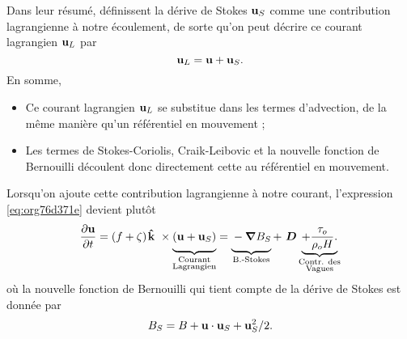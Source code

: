 \documentclass[10pt]{article}
\numberwithin{equation}{section}
\newcommand{\kvf}{\vb{\hat{k}}}
\newcommand{\uu}{\vb{u}}
\newcommand{\grande}{\vphantom{\frac{1}{xx}}}
\newcommand{\pt}{\hspace{1pt}} %
\begin{document}
Dans leur résumé, \Textcite{suzuki2016understanding}  définissent la dérive de Stokes \(\uu_S\) comme une contribution lagrangienne à notre écoulement, de sorte qu'on peut décrire ce courant lagrangien \(\uu_L\) par
\begin{equation}
   \uu_L = \uu + \uu_S.
\end{equation}
En somme, 
\begin{itemize}
\item Ce courant lagrangien \(\uu_L\) se substitue dans les termes d'advection, de la même manière qu'un référentiel en mouvement ;
\item Les termes de Stokes-Coriolis, Craik-Leibovic et la nouvelle fonction de Bernouilli découlent donc directement cette au référentiel en mouvement. \bigskip
\end{itemize}

Lorsqu'on ajoute cette contribution lagrangienne à notre courant, l'expression \ref{eq:org76d371e} devient plutôt
\begin{equation}
   \pdv{\uu}{t} = \qty(f+\zeta)\pt \kvf\ \times\underbrace{\grande\qty(\uu + \uu_S)}_{\substack{\text{Courant} \\ \text{Lagrangien}}} = \underbrace{\grande-\gradient{B_S}}_\text{B.-Stokes} + \ \boldsymbol{D} \underbrace{+ \frac{\tau_o}{\rho_o H}.}_{\substack{\text{Contr. des} \\ \text{Vagues}}}
\end{equation}
où la nouvelle fonction de Bernouilli qui tient compte de la dérive de Stokes est donnée par
\begin{align}
   B_S = B + \uu\cdot\uu_S + \uu_S^2/2.
\end{align}

\printbibliography
\end{document}

